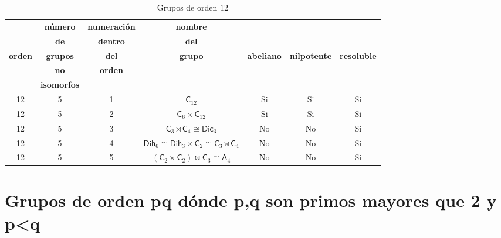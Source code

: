 \documentclass[final,12pt,a4paper,twoside,fleqn]{extbook}
\newcommand{\grclass}[1]{\ensuremath{\mathsf{#1}}}
\newcommand{\cyclicgr}[1]{\ensuremath{{\grclass{C}}_{#1}}}
\theoremstyle{definition}
\theoremstyle{remark}
\begin{document}
\begin{table}[h!]
    \begin{center}
        \caption{Grupos de orden $12$}
        \label{tab:GruposOrden12}
        \begin{tabular}{c|c|c|c|c|c|c} %
            \textbf{} & \tiny\textbf{n\'umero} &\tiny\textbf{numeraci\'on} & \tiny\textbf{nombre} & \textbf{} & {} & {} \\
            \textbf{} & \tiny\textbf{de} &\tiny\textbf{dentro} & \tiny\textbf{del} & \tiny\textbf{} & {} & {} \\
            \tiny\textbf{orden} & \tiny\textbf{grupos} & \tiny\textbf{del} & \tiny\textbf{grupo} & \tiny\textbf{abeliano}  & \tiny\textbf{nilpotente} & \tiny\textbf{resoluble} \\
            \textbf{} & \tiny\textbf{no} & \tiny\textbf{orden} & \textbf{} & \textbf{} & {} & {} \\
            \textbf{} & \tiny\textbf{isomorfos} &\textbf{} & \textbf{} & \textbf{} & {} & {} \\
            \hline
            12 & 5 & 1 & ${{\mathsf{C}}_{12}}$ & Si & Si & Si \\
            \hline
            12 & 5 & 2  & ${{\textsf{C}}_{6}}             \times             {{\mathsf{C}}_{12}}$ & Si & Si & Si \\
            \hline
            12 & 5 & 3 & ${\textsf{C}}_{3}\rtimes{\textsf{C}}_{4}             \cong             \mathsf{Dic}_{3}$& No & No & Si \\
            \hline
            12 & 5 & 4 & ${{\textsf{Dih}}_{6}}             \cong             {{\mathsf{Dih}_{3}}             \times             }{\cyclicgr{2}}             \cong             {{\cyclicgr{3}}\rtimes}{\cyclicgr{4}}$ & No & No & Si \\
            \hline
            12 & 5 & 5 & ${\left({{\textsf{C}}_{2}}             \times             {{\textsf{C}}_{2}}\right)}\bowtie {{\textsf{C}}_{3}}             \cong             {{\mathsf{A}_{4}}}$ & No & No & Si \\
            \hline
        \end{tabular}
    \end{center}
\end{table}

\chapter{Grupos de orden pq d\'onde p,q son primos mayores que 2 y p<q}
\end{document}
